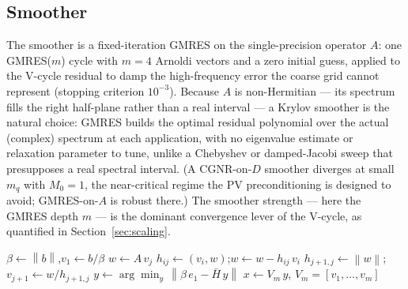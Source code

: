 \documentclass[12pt,a4paper]{article}
\newcommand{\Ddw}{D}
\newcommand{\Aop}{A}
\newcommand{\norm}[1]{\left\lVert #1 \right\rVert}
\begin{document}
\subsection{Smoother}
The smoother is a fixed-iteration GMRES on the single-precision operator $\Aop$:
one GMRES($m$) cycle with $m=4$ Arnoldi vectors and a zero initial guess, applied
to the V-cycle residual to damp the high-frequency error the coarse grid cannot
represent (stopping criterion $10^{-3}$). Because $\Aop$ is non-Hermitian
--- its spectrum fills the right half-plane rather than a real interval --- a
Krylov smoother is the natural choice: GMRES builds the optimal residual polynomial
over the actual (complex) spectrum at each application, with no eigenvalue estimate
or relaxation parameter to tune, unlike a Chebyshev or damped-Jacobi sweep that
presupposes a real spectral interval. (A CGNR-on-$\Ddw$ smoother diverges at small
$m_q$ with $M_0=1$, the near-critical regime the PV preconditioning is designed to
avoid; GMRES-on-$\Aop$ is robust there.) The smoother strength --- here the GMRES
depth $m$ --- is the dominant convergence lever of the V-cycle, as quantified in
Section~\ref{sec:scaling}.

\begin{algorithm}[H]
\caption{$\mathrm{GMRES}_m(\Aop,b)$: $m$ Arnoldi steps with a zero initial guess,
returning $x\approx\Aop^{-1}b$. The smoother is one cycle with $m=4$; the coarse
solver runs the same routine with $m=5$ for at most two restart cycles, to
tolerance $10^{-2}$.}
\label{alg:gmres}
\begin{algorithmic}[1]
\State $\beta \gets \norm{b}$,\quad $v_1 \gets b/\beta$
  \State $w \gets \Aop\,v_j$
   
    \State $h_{ij}\gets(v_i,w)$;\quad $w \gets w - h_{ij}\,v_i$
  \EndFor
  \State $h_{j+1,j}\gets\norm{w}$;\quad $v_{j+1}\gets w/h_{j+1,j}$
\EndFor
\State $y \gets \arg\min_{y}\,\norm{\beta\,e_1 - \bar H\,y}$ 
\State \Return $x \gets V_m\,y$, \quad $V_m=[v_1,\dots,v_m]$
\end{algorithmic}
\end{algorithm}
\end{document}
